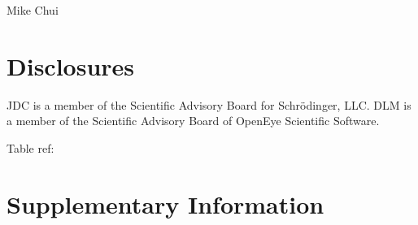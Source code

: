 \documentclass[9pt,lineno,final]{elife}
\newcommand{\beginsupplement}{%
        \setcounter{table}{0}
        \renewcommand{\thetable}{S\arabic{table}}%
        \setcounter{figure}{0}
        \renewcommand{\thefigure}{S\arabic{figure}}%
     }
\begin{document}
Mike Chui

\section{Disclosures}

JDC is a member of the Scientific Advisory Board for Schr\"{o}dinger, LLC.
DLM is a member of the Scientific Advisory Board of OpenEye Scientific Software.

Table ref: \cite{ACD-pKa-galas, ACD-pKa-classic, simulation-plus-pKa, chemicalize-pKa, moka-pKa}







\newpage
\beginsupplement
\section{Supplementary Information}
\end{document}
